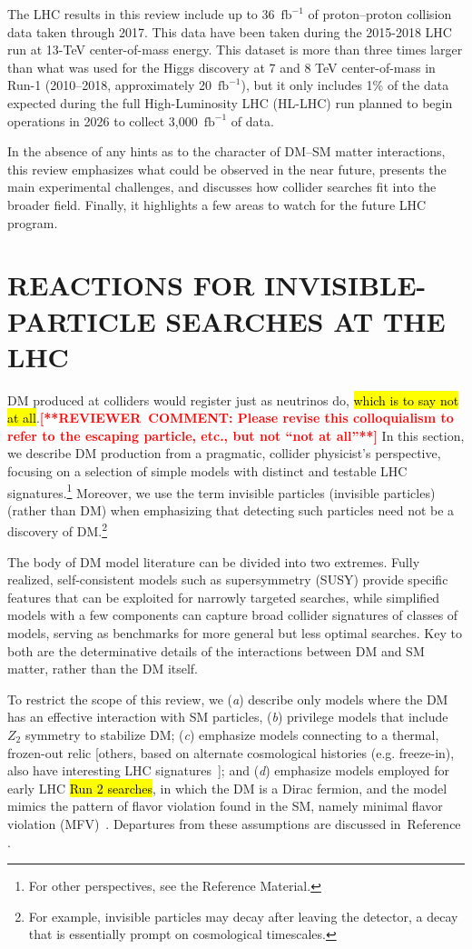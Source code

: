 \documentclass{ar-1col}
\newcommand{\IP}{invisible particle}
\newcommand{\ifb}{\ensuremath{\mathrm{fb}^{-1}}\xspace}
\begin{document}
The LHC results in this review include up to
36~\ifb of proton--proton collision data taken through 2017. 
This data have been taken during the 2015-2018 LHC run at 13-TeV center-of-mass energy.
This dataset is more than three times larger than what was used for the Higgs discovery
at 7 and 8 TeV center-of-mass in Run-1 (2010--2018, approximately 20~\ifb),
but it only includes 1\% of the data expected during the full High-Luminosity LHC (HL-LHC)
run planned to begin operations in 2026 to collect 3,000~\ifb of data. 

In the absence of any hints as to the character of DM--SM
matter interactions, this review emphasizes what could be observed in the near
future, presents the main experimental challenges, and discusses how
collider searches fit into the broader field. Finally, it
highlights a few areas to watch for the future LHC program.

\section{REACTIONS FOR INVISIBLE-PARTICLE SEARCHES AT THE LHC}\label{sec:02_Reactions}

DM produced at colliders would register just as neutrinos do,
\hl{which is to say not at all}.\textbf{\textcolor{red}{[**REVIEWER\ COMMENT: Please revise this colloquialism to refer to the escaping particle, etc., but not ``not at all''**]}} In this section, we describe DM
production from a pragmatic, collider physicist's perspective,
focusing on a selection of simple models with distinct and
testable LHC signatures.\footnote{For other perspectives, see the
Reference Material.} Moreover, we use the term {invisible
particles ({\IP}s)} (rather than DM) when emphasizing that detecting such
particles need not be a discovery of DM.\footnote{For example,
{\IP}s may decay after leaving the detector, a decay that is
essentially prompt on cosmological timescales.}

The body of DM model literature can be divided into two extremes.
Fully realized, self-consistent models such as supersymmetry (SUSY) provide
specific features that can be exploited for narrowly targeted
searches, while simplified models with a few components can
capture broad collider signatures of classes of models, serving as
benchmarks for more general but less optimal searches. Key to both
are the determinative details of the interactions between DM
and SM matter, rather than the DM itself.

To restrict the scope of this review,
we (\textit{a}) describe only models where the DM has an effective interaction with SM particles, 
(\textit{b}) privilege models that include $Z_2$ symmetry to stabilize DM; 
(\textit{c}) emphasize models connecting to a thermal, frozen-out relic 
[others, based on alternate cosmological histories (e.g. freeze-in), also have interesting LHC signatures~\cite{Bernal:2017kxu,Brooijmans:2018xbu}]; 
and (\textit{d}) emphasize models employed for early LHC \hl{Run 2 searches},
in which the DM is a Dirac fermion, and the model mimics the pattern of flavor violation found in the SM, namely minimal flavor violation (MFV)~\cite{DAmbrosio:2002vsn}. 
Departures from these assumptions are discussed in~Reference .
\end{document}
